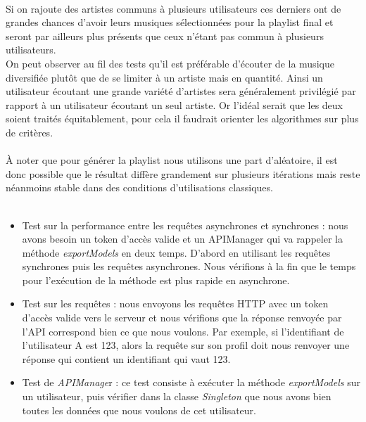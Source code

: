\documentclass[12pt, openany]{report}
\begin{document}
\paragraph{}Si on rajoute des artistes communs à plusieurs utilisateurs ces derniers ont de grandes chances d'avoir leurs musiques sélectionnées pour la playlist final et seront par ailleurs plus présents que ceux n'étant pas commun à plusieurs utilisateurs. \\
On peut observer au fil des tests qu'il est préférable d'écouter de la musique diversifiée plutôt que de se limiter à un artiste mais en quantité. Ainsi un utilisateur écoutant une grande variété d'artistes sera généralement privilégié par rapport à un utilisateur écoutant un seul artiste. Or l'idéal serait que les deux soient traités équitablement, pour cela il faudrait orienter les algorithmes sur plus de critères. \\
\paragraph{}À noter que pour générer la playlist nous utilisons une part d'aléatoire, il est donc possible que le résultat diffère grandement sur plusieurs itérations mais reste néanmoins stable dans des conditions d'utilisations classiques.
\\
\\
\begin{itemize}
    \item Test sur la performance entre les requêtes asynchrones et synchrones : nous avons besoin un token d'accès valide et un APIManager qui va rappeler la méthode \textit{exportModels} en deux temps. D'abord en utilisant les requêtes synchrones puis les requêtes asynchrones. Nous vérifions à la fin que le temps pour l'exécution de la méthode est plus rapide en asynchrone.
    
    \item Test sur les requêtes : nous envoyons les requêtes HTTP avec un token d'accès valide vers le serveur et nous vérifions que la réponse renvoyée par l'API correspond bien ce que nous voulons. Par exemple, si l'identifiant de l'utilisateur A est 123, alors la requête sur son profil doit nous renvoyer une réponse qui contient un identifiant qui vaut 123.
    
    \item Test de \textit{APIManage}r : ce test consiste à exécuter la méthode \textit{exportModels} sur un utilisateur, puis vérifier dans la classe \textit{Singleton} que nous avons bien toutes les données que nous voulons de cet utilisateur.
\end{itemize}
\end{document}
